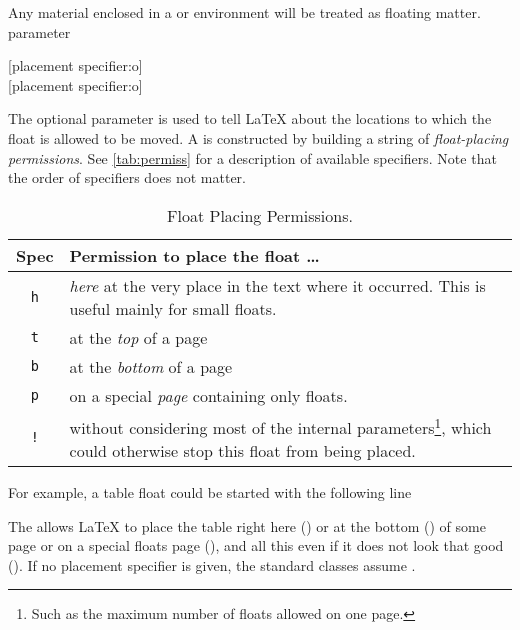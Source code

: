 Any material enclosed in a  or  environment will
be treated as floating matter.
parameter
\begin{lscommand}
  [placement specifier:o] \\
  [placement specifier:o]
\end{lscommand}
The optional  parameter is used to tell \LaTeX{}
about the locations to which the float is allowed to be moved.  A
 is constructed by building a string of
\emph{float-placing permissions}. See \autoref{tab:permiss} for a description
of available specifiers. Note that the order of specifiers does not matter.

\begin{table}
  \begin{minipage}{\textwidth}
    \centering
    \caption{Float Placing Permissions.}\label{tab:permiss}
    \begin{tabular}{@{}cp{8cm}@{}}
      \toprule
      Spec       & Permission to place the float \ldots             \\
      \midrule
      \texttt{h} & \emph{here} at the very place in the text
      where it occurred.  This is useful mainly for small floats.   \\
      \texttt{t} & at the \emph{top} of a page                      \\
      \texttt{b} & at the \emph{bottom} of a page                   \\
      \texttt{p} & on a special \emph{page} containing only floats. \\
      \texttt{!} & without considering most of the
      internal parameters\footnote{Such as the
        maximum number of floats allowed  on one page.},
      which could otherwise stop this
      float from being placed.                                      \\
      \bottomrule
    \end{tabular}
  \end{minipage}
\end{table}

For example, a table float could be started with the following line
\begin{code}
\texttt|\begin{table}[!hbp]|
\end{code}
The  \cargv{[!hbp]} allows \LaTeX{} to
place the table right here () or at the bottom ()
of some page
or on a special floats page (), and all this even if it does not
look that good (\cargv{!}). If no placement specifier is given, the standard
classes assume \cargv{[tbp]}.

